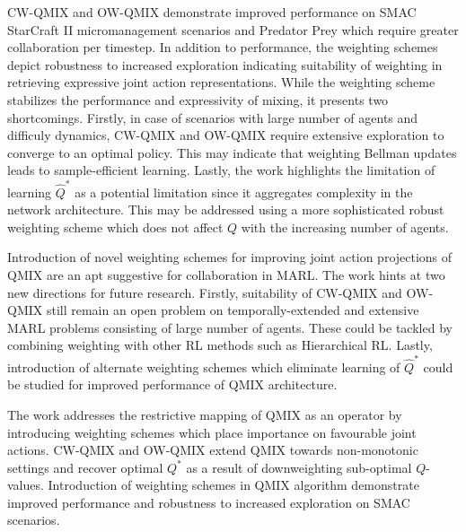 \documentclass[11pt,letterpaper]{article}
\begin{document}
CW-QMIX and OW-QMIX demonstrate improved performance on SMAC StarCraft II micromanagement scenarios and Predator Prey which require greater collaboration per timestep. In addition to performance, the weighting schemes depict robustness to increased exploration indicating suitability of weighting in retrieving expressive joint action representations. While the weighting scheme stabilizes the performance and expressivity of mixing, it presents two shortcomings. Firstly, in case of scenarios with large number of agents and difficuly dynamics, CW-QMIX and OW-QMIX require extensive exploration to converge to an optimal policy. This may indicate that weighting Bellman updates leads to sample-efficient learning. Lastly, the work highlights the limitation of learning $\hat{Q}^{*}$ as a potential limitation since it aggregates complexity in the network architecture. This may be addressed using a more sophisticated robust weighting scheme which does not affect $Q$ with the increasing number of agents. 

Introduction of novel weighting schemes for improving joint action projections of QMIX are an apt suggestive for collaboration in MARL. The work hints at two new directions for future research. Firstly, suitability of CW-QMIX and OW-QMIX still remain an open problem on temporally-extended and extensive MARL problems consisting of large number of agents. These could be tackled by combining weighting with other RL methods such as Hierarchical RL. Lastly, introduction of alternate weighting schemes which eliminate learning of $\hat{Q}^{*}$ could be studied for improved performance of QMIX architecture. 

The work addresses the restrictive mapping of QMIX as an operator by introducing weighting schemes which place importance on favourable joint actions. CW-QMIX and OW-QMIX extend QMIX towards non-monotonic settings and recover optimal $Q^{*}$ as a result of downweighting sub-optimal $Q$-values. Introduction of weighting schemes in QMIX algorithm demonstrate improved performance and robustness to increased exploration on SMAC scenarios. 
\end{document}
